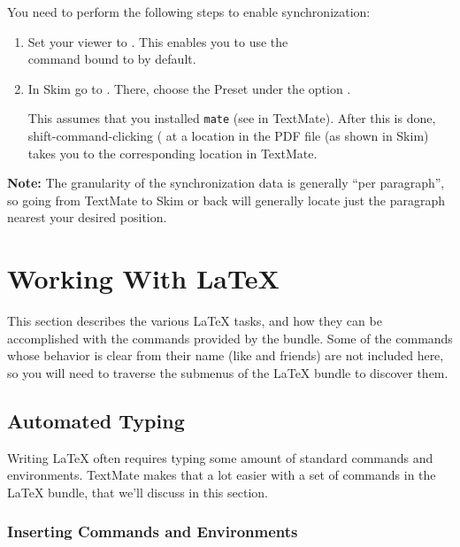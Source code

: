 \documentclass[11pt, x11names]{article}
\begin{document}
You need to perform the following steps to enable synchronization:

\begin{enumerate}

  \item Set your viewer to . This enables you to use the\\ command bound to  by default.

  \item In Skim go to . There, choose the Preset  under the option .

  This assumes that you installed \texttt{mate} (see  in TextMate). After this is done, shift-command-clicking (\keys{\shift + \cmd} at a location in the PDF file (as shown in Skim) takes you to the corresponding location in TextMate.

\end{enumerate}

\textbf{Note:} The granularity of the synchronization data is generally “per paragraph”, so going from TextMate to Skim or back will generally locate just the paragraph nearest your desired position.

\section{Working With LaTeX}

This section describes the various LaTeX tasks, and how they can be accomplished with the commands provided by the bundle. Some of the commands whose behavior is clear from their name (like  and friends) are not included here, so you will need to traverse the submenus of the LaTeX bundle to discover them.

\subsection{Automated Typing}

Writing LaTeX often requires typing some amount of standard commands and environments. TextMate makes that a lot easier with a set of commands in the LaTeX bundle, that we'll discuss in this section.

\subsubsection{Inserting Commands and
Environments}
\end{document}
